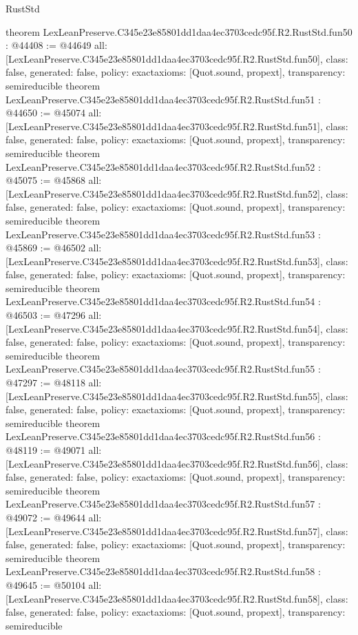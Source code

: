 \begin{lexlean}{RustStd}
\begin{coremodule}
{}
theorem LexLeanPreserve.C345e23e85801dd1daa4ec3703cedc95f.R2.RustStd.fun50 : @44408 := @44649 {
  all: [LexLeanPreserve.C345e23e85801dd1daa4ec3703cedc95f.R2.RustStd.fun50],
  class: false,
  generated: false,
  policy: exact{axioms: [Quot.sound, propext]},
  transparency: semireducible
}
theorem LexLeanPreserve.C345e23e85801dd1daa4ec3703cedc95f.R2.RustStd.fun51 : @44650 := @45074 {
  all: [LexLeanPreserve.C345e23e85801dd1daa4ec3703cedc95f.R2.RustStd.fun51],
  class: false,
  generated: false,
  policy: exact{axioms: [Quot.sound, propext]},
  transparency: semireducible
}
theorem LexLeanPreserve.C345e23e85801dd1daa4ec3703cedc95f.R2.RustStd.fun52 : @45075 := @45868 {
  all: [LexLeanPreserve.C345e23e85801dd1daa4ec3703cedc95f.R2.RustStd.fun52],
  class: false,
  generated: false,
  policy: exact{axioms: [Quot.sound, propext]},
  transparency: semireducible
}
theorem LexLeanPreserve.C345e23e85801dd1daa4ec3703cedc95f.R2.RustStd.fun53 : @45869 := @46502 {
  all: [LexLeanPreserve.C345e23e85801dd1daa4ec3703cedc95f.R2.RustStd.fun53],
  class: false,
  generated: false,
  policy: exact{axioms: [Quot.sound, propext]},
  transparency: semireducible
}
theorem LexLeanPreserve.C345e23e85801dd1daa4ec3703cedc95f.R2.RustStd.fun54 : @46503 := @47296 {
  all: [LexLeanPreserve.C345e23e85801dd1daa4ec3703cedc95f.R2.RustStd.fun54],
  class: false,
  generated: false,
  policy: exact{axioms: [Quot.sound, propext]},
  transparency: semireducible
}
theorem LexLeanPreserve.C345e23e85801dd1daa4ec3703cedc95f.R2.RustStd.fun55 : @47297 := @48118 {
  all: [LexLeanPreserve.C345e23e85801dd1daa4ec3703cedc95f.R2.RustStd.fun55],
  class: false,
  generated: false,
  policy: exact{axioms: [Quot.sound, propext]},
  transparency: semireducible
}
theorem LexLeanPreserve.C345e23e85801dd1daa4ec3703cedc95f.R2.RustStd.fun56 : @48119 := @49071 {
  all: [LexLeanPreserve.C345e23e85801dd1daa4ec3703cedc95f.R2.RustStd.fun56],
  class: false,
  generated: false,
  policy: exact{axioms: [Quot.sound, propext]},
  transparency: semireducible
}
theorem LexLeanPreserve.C345e23e85801dd1daa4ec3703cedc95f.R2.RustStd.fun57 : @49072 := @49644 {
  all: [LexLeanPreserve.C345e23e85801dd1daa4ec3703cedc95f.R2.RustStd.fun57],
  class: false,
  generated: false,
  policy: exact{axioms: [Quot.sound, propext]},
  transparency: semireducible
}
theorem LexLeanPreserve.C345e23e85801dd1daa4ec3703cedc95f.R2.RustStd.fun58 : @49645 := @50104 {
  all: [LexLeanPreserve.C345e23e85801dd1daa4ec3703cedc95f.R2.RustStd.fun58],
  class: false,
  generated: false,
  policy: exact{axioms: [Quot.sound, propext]},
  transparency: semireducible
}
\end{coremodule}
\end{lexlean}
